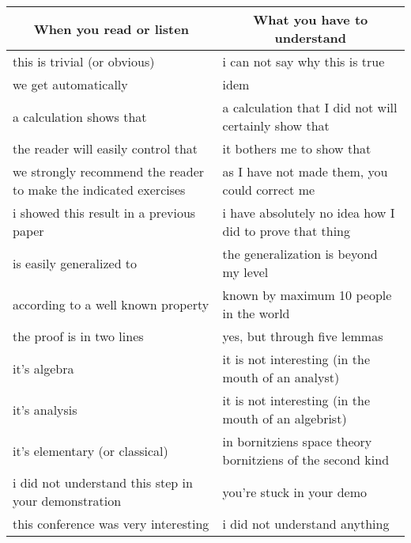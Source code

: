 	\begin{table}[H]
	\begin{center}
			\begin{tabular}{|p{7.5cm}|p{7.5cm}|}
				\hline
				\multicolumn{1}{c}{\cellcolor[gray]{0.75}\textbf{When you read or listen}} & 
  \multicolumn{1}{c}{\cellcolor[gray]{0.75}\textbf{What you have to understand}} \\ \hline
				this is trivial (or obvious) & i can not say why this is true \\ \hline
				we get automatically & idem \\ \hline
				a calculation shows that & a calculation that I did not will certainly show that\\ \hline
				the reader will easily control that & it bothers me to show that\\ \hline
				we strongly recommend the reader to make the indicated exercises & as I have not made them, you could correct me\\ \hline
				i showed this result in a previous paper & i have absolutely no idea how I did to prove that thing			
				\\ \hline
				is easily generalized to & the generalization is beyond my level			
				\\ \hline
				according to a well known property & known by maximum 10 people in the world
				\\ \hline
				the proof is in two lines & yes, but through five lemmas
				\\ \hline
				it's algebra & it is not interesting (in the mouth of an analyst)
				\\ \hline
				it's analysis & it is not interesting (in the mouth of an algebrist)
				\\ \hline
				it's elementary (or classical) & in bornitziens space theory bornitziens of the second kind
				\\ \hline
				i did not understand this step in your demonstration & you're stuck in your demo
				\\ \hline
				this conference was very interesting & i did not understand anything
				\\ \hline
		\end{tabular}
	\end{center}
	\end{table}	
	\begin{center}\underline{\hspace{5 cm}}\end{center}
	
